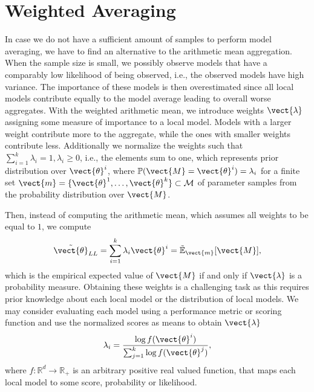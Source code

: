 \section{Weighted Averaging}
In case we do not have a sufficient amount of samples to perform model averaging, we have to find an alternative to the arithmetic mean aggregation. 
When the sample size is small, we possibly observe models that have a comparably low likelihood of being observed, i.e., the observed models have high variance. 
The importance of these models is then overestimated since all local models contribute equally to the model average leading to overall worse aggregates.
With the weighted arithmetic mean, we introduce weights $\vect{\lambda}$ assigning some measure of importance to a local model. 
Models with a larger weight contribute more to the aggregate, while the ones with smaller weights contribute less.
Additionally we normalize the weights such that $\sum_{i=1}^k \lambda_i = 1, \lambda_i \geq 0$, i.e., the elements sum to one, which represents prior distribution over $\vect{\theta}^i$, where $\mathbb{P}(\vect{M} = \vect{\theta}^i) = \lambda_i$ for a finite set $\vect{m} = \{\vect{\theta}^1, \ldots, \vect{\theta}^k\} \subset \mathcal{M}$ of parameter samples from the probability distribution over $\vect{M}$.

Then, instead of computing the arithmetic mean, which assumes all weights to be equal to $1$, we compute
\begin{equation}
     \tilde{\vect{\theta}}_{LL} = \sum_{i=1}^k \lambda_i \vect{\theta}^i = \tilde{\mathbb{E}}_{\vect{m}}[\vect{M}],
\end{equation}
which is the empirical expected value of $\vect{M}$ if and only if $\vect{\lambda}$ is a probability measure.
Obtaining these weights is a challenging task as this requires prior knowledge about each local model or the distribution of local models.
We may consider evaluating each model using a performance metric or scoring function and use the normalized scores as means to obtain $\vect{\lambda}$
\begin{equation}
    \lambda_i = \frac{\log f(\vect{\theta}^i)}{\sum_{j=1}^k \log f(\vect{\theta}^j)},
\end{equation}
where $f: \mathbb{R}^d \rightarrow \mathbb{R}_+$ is an arbitrary positive real valued function, that maps each local model to some score, probability or likelihood.


